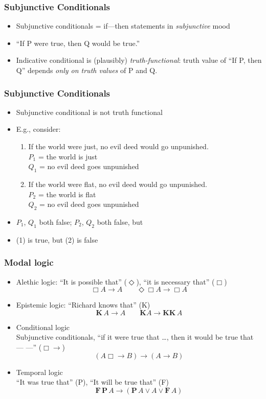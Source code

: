 \begin{frame}
\frametitle{Subjunctive Conditionals}

\begin{itemize}[<+->]
\item Subjunctive conditionals = if---then statements in \emph{subjunctive} mood
\item ``If P were true, then Q would be true.''
\item Indicative conditional is (plausibly) \emph{truth-functional}:
  truth value of ``If P, then Q'' depends \emph{only on truth values}
  of P and Q.
\end{itemize}
\end{frame}

\begin{frame}
\frametitle{Subjunctive Conditionals}

\begin{itemize}[<+->]
\item Subjunctive conditional is not truth functional
\item E.g., consider:
\begin{enumerate}
\item If the world were just, no evil deed would go unpunished.\\
$P_1$ = the world is just\\
$Q_1$ = no evil deed goes unpunished
\item If the world were flat, no evil deed would go unpunished.\\
$P_2$ = the world is flat\\
$Q_2$ = no evil deed goes unpunished
\end{enumerate}
\item $P_1$, $Q_1$ both false; $P_2$, $Q_2$ both false, but
\item (1) is true, but (2) is false
\end{itemize}
\end{frame}

\begin{frame}
    \frametitle{Modal logic}

\begin{itemize}[<+->]
\item Alethic logic: 
``It is possible that'' ($\Diamond$), ``it is necessary that'' ($\Box$)
\[
\Box A \to A \qquad \Diamond\Box A \to \Box A
\]
\item Epistemic logic:
``Richard knows that'' (K)
\[
\textbf{K}\, A \to A \qquad \textbf{K} A \to \textbf{K}\textbf{K}\, A
\]
\item Conditional logic\\
Subjunctive conditionals, ``if it were true that \dots, then it would be true that --- ---'' ($\Box\!\!\to$)
\[
(A \mathrel{\Box\!\!\to} B) \to (A \to B)
\]
\item Temporal logic\\
``It was true that'' (P), ``It will be true that'' (F)
\[
\textbf{F}\,\textbf{P}\, A \to (\textbf{P}\, A \lor A \lor \textbf{F}\, A)
\]
\end{itemize}

\end{frame}

